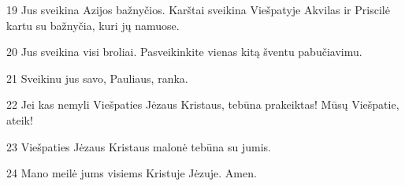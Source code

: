 \par 19 Jus sveikina Azijos bažnyčios. Karštai sveikina Viešpatyje Akvilas ir Priscilė kartu su bažnyčia, kuri jų namuose. 
\par 20 Jus sveikina visi broliai. Pasveikinkite vienas kitą šventu pabučiavimu. 
\par 21 Sveikinu jus savo, Pauliaus, ranka. 
\par 22 Jei kas nemyli Viešpaties Jėzaus Kristaus, tebūna prakeiktas! Mūsų Viešpatie, ateik! 
\par 23 Viešpaties Jėzaus Kristaus malonė tebūna su jumis. 
\par 24 Mano meilė jums visiems Kristuje Jėzuje. Amen.



